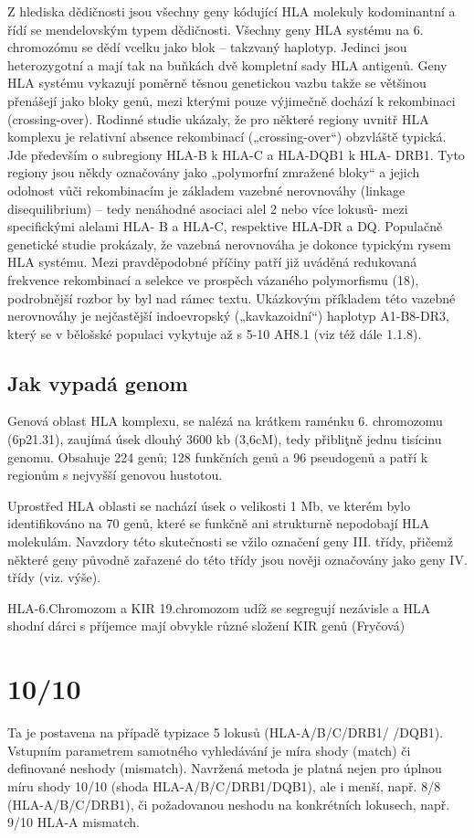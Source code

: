 \documentclass[czech,DP]{thesiskiv}
\begin{document}
Z hlediska dědičnosti jsou všechny geny kódující HLA molekuly
kodominantní a řídí se mendelovským typem dědičnosti. Všechny
geny HLA systému na 6. chromozómu se dědí vcelku jako blok –
takzvaný haplotyp. Jedinci jsou heterozygotní a mají tak na
buňkách dvě kompletní sady HLA antigenů.
Geny HLA systému vykazují poměrně těsnou genetickou vazbu
takže se většinou přenášejí jako bloky genů, mezi kterými pouze
výjimečně dochází k rekombinaci (crossing-over). Rodinné studie
ukázaly, že pro některé regiony uvnitř HLA komplexu je relativní
absence rekombinací („crossing-over“) obzvláště typická. Jde
především o subregiony HLA-B k HLA-C a HLA-DQB1 k HLA-
DRB1. Tyto regiony jsou někdy označovány jako „polymorfní
zmražené bloky“ a jejich odolnost vůči rekombinacím je základem
vazebné nerovnováhy (linkage disequilibrium) – tedy nenáhodné
asociaci alel 2 nebo více lokusů- mezi specifickými alelami HLA-
B a HLA-C, respektive HLA-DR a DQ.
Populačně genetické studie prokázaly, že vazebná nerovnováha
je dokonce typickým rysem HLA systému. Mezi pravděpodobné
příčiny patří již uváděná redukovaná frekvence rekombinací a
selekce ve prospěch vázaného polymorfismu (18), podrobnější
rozbor by byl nad rámec textu. Ukázkovým příkladem této
vazebné nerovnováhy je nejčastější indoevropský („kavkazoidní“)
haplotyp A1-B8-DR3, který se v bělošské populaci vykytuje až
s 5-10%
AH8.1 (viz též dále 1.1.8).

\subsection{Jak vypadá genom} 
Genová oblast HLA komplexu, se nalézá na krátkem raménku 6. chromozomu (6p21.31), zaujímá úsek dlouhý 3600 kb
(3,6cM), tedy přibliţně jednu tisícinu genomu. Obsahuje 224 genů; 128 funkčních genů
a 96 pseudogenů a patří k regionům s nejvyšší genovou hustotou.

Uprostřed HLA oblasti se nachází úsek o velikosti 1 Mb, ve kterém bylo identifikováno na
70 genů, které se funkčně ani strukturně nepodobají HLA molekulám. Navzdory této
skutečnosti se vžilo označení geny III. třídy, přičemž některé geny původně zařazené do
této třídy jsou nověji označovány jako geny IV. třídy (viz. výše).

HLA-6.Chromozom a KIR 19.chromozom
udíž se segregují nezávisle a
HLA shodní dárci s příjemce mají obvykle různé složení KIR genů (Fryčová)


\section{10/10}
Ta je postavena na případě typizace 5 lokusů (HLA-A/B/C/DRB1/ /DQB1). Vstupním parametrem samotného vyhledávání je míra shody (match) či definované neshody (mismatch). Navržená metoda je platná nejen pro úplnou míru shody 10/10 (shoda HLA-A/B/C/DRB1/DQB1), ale i menší, např. 8/8 (HLA-A/B/C/DRB1), či požadovanou neshodu na konkrétních lokusech, např. 9/10 HLA-A mismatch. 
\end{document}
